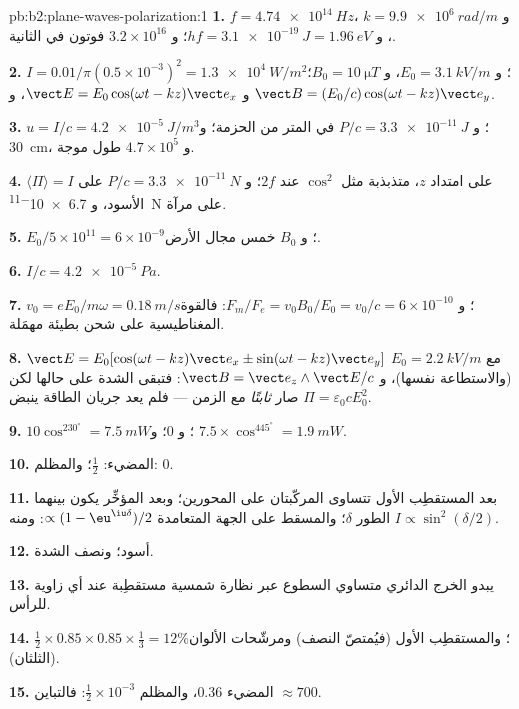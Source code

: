 \begin{solution}{pb:b2:plane-waves-polarization:1}
\textbf{1.} $f = \qty{4.74e14}{Hz}$، و $k = \qty{9.9e6}{rad/m}$، و $hf = \qty{3.1e-19}{J} =
\qty{1.96}{eV}$؛ و $3.2 \times 10^{16}$ فوتون في الثانية.

\textbf{2.} $I = 0.01/\pi(0.5 \times 10^{-3})^2 = \qty{1.3e4}{W/m^2}$؛ و $E_0 = \qty{3.1}{kV/m}$،
و $B_0 = \qty{10}{\micro T}$؛ و $\vect E = E_0\cos(\omega t - kz)\vect e_x$، و $\vect B = (E_0/c)\cos(\omega t
- kz)\vect e_y$.

\textbf{3.} $u = I/c = \qty{4.2e-5}{J/m^3}$؛ و $P/c = \qty{3.3e-11}{J}$ في المتر من
الحزمة؛ و \qty{30}{cm}، و $4.7 \times 10^5$ طول موجة.

\textbf{4.} $\langle\Pi\rangle = I$ على امتداد $z$، متذبذبة مثل $\cos^2$ عند $2f$؛
و $P/c = \qty{3.3e-11}{N}$ على الأسود، و \qty{6.7e-11}{N} على مرآة.

\textbf{5.} $E_0/5 \times 10^{11} = 6 \times 10^{-9}$؛ و $B_0$ خمس مجال
الأرض.

\textbf{6.} $I/c = \qty{4.2e-5}{Pa}$.

\textbf{7.} $v_0 = eE_0/m\omega = \qty{0.18}{m/s}$؛ و $F_m/F_e = v_0B_0/E_0 = v_0/c = 6 \times
10^{-10}$: فالقوة المغناطيسية على شحن بطيئة مهمَلة.

\textbf{8.} $\vect E = E_0[\cos(\omega t - kz)\vect e_x \pm \sin(\omega t - kz)\vect e_y]$ مع
$E_0 = \qty{2.2}{kV/m}$ (والاستطاعة نفسها)، و $\vect B = \vect e_z\wedge\vect E/c$: فتبقى
الشدة على حالها لكن $\Pi = \varepsilon_0cE_0^2$ صار \emph{ثابتًا} مع
الزمن --- فلم يعد جريان الطاقة ينبض.

\textbf{9.} $10\cos^230^\circ = \qty{7.5}{mW}$؛ و $0$؛ و $7.5 \times \cos^445^\circ = \qty{1.9}{mW}$.

\textbf{10.} المضيء: $\tfrac12$؛ والمظلم: $0$.

\textbf{11.} بعد المستقطِب الأول تتساوى المركّبتان على المحورين؛
وبعد المؤخِّر يكون بينهما الطور $\delta$؛ والمسقط على الجهة
المتعامدة $\propto(1 - \eu^{\iu\delta})/2$: ومنه $I \propto \sin^2(\delta/2)$.

\textbf{12.} أسود؛ ونصف الشدة.

\textbf{13.} يبدو الخرج الدائري متساوي السطوع عبر نظارة شمسية
مستقطِبة عند أي زاوية للرأس.

\textbf{14.} $\tfrac12 \times 0.85 \times 0.85 \times \tfrac13 = 12\%$؛ والمستقطِب الأول
(فيُمتصّ النصف) ومرشّحات الألوان (الثلثان).

\textbf{15.} المضيء $0.36$، والمظلم $\tfrac12 \times 10^{-3}$: فالتباين $\approx 700$.


\end{solution}
